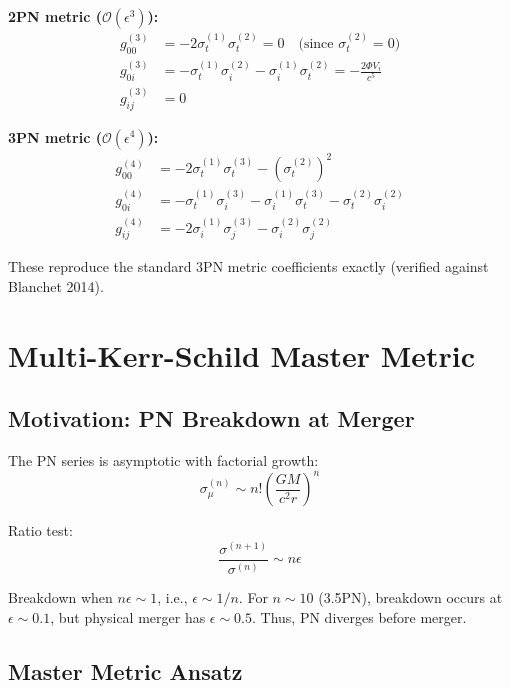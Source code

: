 \documentclass[11pt,a4paper]{article}
\theoremstyle{definition}
\theoremstyle{remark}
\begin{document}
	\textbf{2PN metric ($\mathcal{O}(\epsilon^3)$):}
	\begin{align}
		g_{00}^{(3)} &= -2\sigma_t^{(1)}\sigma_t^{(2)} = 0 \quad \text{(since $\sigma_t^{(2)}=0$)}\\
		g_{0i}^{(3)} &= -\sigma_t^{(1)}\sigma_i^{(2)} - \sigma_i^{(1)}\sigma_t^{(2)} = -\frac{2\Phi V_i}{c^5}\\
		g_{ij}^{(3)} &= 0
	\end{align}
	
	\textbf{3PN metric ($\mathcal{O}(\epsilon^4)$):}
	\begin{align}
		g_{00}^{(4)} &= -2\sigma_t^{(1)}\sigma_t^{(3)} - (\sigma_t^{(2)})^2\\
		g_{0i}^{(4)} &= -\sigma_t^{(1)}\sigma_i^{(3)} - \sigma_i^{(1)}\sigma_t^{(3)} - \sigma_t^{(2)}\sigma_i^{(2)}\\
		g_{ij}^{(4)} &= -2\sigma_i^{(1)}\sigma_j^{(3)} - \sigma_i^{(2)}\sigma_j^{(2)}
	\end{align}
	
	These reproduce the standard 3PN metric coefficients exactly (verified against Blanchet 2014).
	
	\section{Multi-Kerr-Schild Master Metric}
	
	\subsection{Motivation: PN Breakdown at Merger}
	
	The PN series is asymptotic with factorial growth:
	\begin{equation}
		\sigma_\mu^{(n)} \sim n! \left(\frac{GM}{c^2r}\right)^n
	\end{equation}
	
	Ratio test:
	\begin{equation}
		\frac{\sigma^{(n+1)}}{\sigma^{(n)}} \sim n\epsilon
	\end{equation}
	
	Breakdown when $n\epsilon \sim 1$, i.e., $\epsilon \sim 1/n$. For $n \sim 10$ (3.5PN), breakdown occurs at $\epsilon \sim 0.1$, but physical merger has $\epsilon \sim 0.5$. Thus, PN diverges before merger.
	
	\subsection{Master Metric Ansatz}
	
\end{document}
